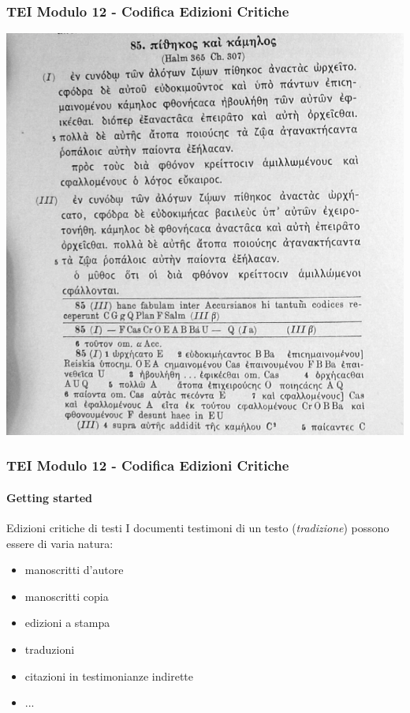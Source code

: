 \begin{frame}
    \frametitle{TEI Modulo 12 - Codifica Edizioni Critiche}
    \addtocounter{nframe}{1}
    
    \begin{center}
        \includegraphics[width=.7\textwidth]{imgs/Edizione-Critica-apparato.png}
    \end{center}

\end{frame}



\begin{frame}
    \frametitle{TEI Modulo 12 - Codifica Edizioni Critiche}
    \framesubtitle{Getting started}
    \addtocounter{nframe}{1}

    


    \begin{block}{Edizioni critiche di testi}
        I documenti testimoni di un testo (\textit{tradizione}) possono essere di varia natura:
        \begin{itemize}
            \item manoscritti d'autore
            \item manoscritti copia
            \item edizioni a stampa
            \item traduzioni
            \item citazioni in testimonianze indirette
            \item ...
        \end{itemize}
    \end{block}

\end{frame}

